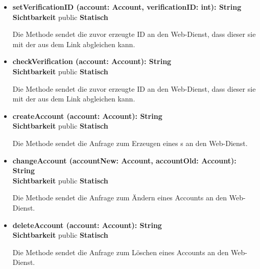 \begin{itemize}
\item \textbf{setVerificationID (account: Account, verificationID: int): String}\hfill\\
\textbf{Sichtbarkeit} public \newline
\textbf{Statisch}

Die Methode sendet die zuvor erzeugte ID an den Web-Dienst, dass dieser sie mit der aus dem Link abgleichen kann.

\item \textbf{checkVerification (account: Account): String}\hfill\\
\textbf{Sichtbarkeit} public \newline
\textbf{Statisch}

Die Methode sendet die zuvor erzeugte ID an den Web-Dienst, dass dieser sie mit der aus dem Link abgleichen kann.

\item \textbf{createAccount (account: Account): String}\hfill\\
\textbf{Sichtbarkeit} public \newline
\textbf{Statisch}

Die Methode sendet die Anfrage zum Erzeugen eines s an den Web-Dienst.

\item \textbf{changeAccount (accountNew: Account, accountOld: Account): String}\hfill\\
\textbf{Sichtbarkeit} public \newline
\textbf{Statisch}

Die Methode sendet die Anfrage zum Ändern eines Accounts an den Web-Dienst.

\item \textbf{deleteAccount (account: Account): String}\hfill\\
\textbf{Sichtbarkeit} public \newline
\textbf{Statisch}

Die Methode sendet die Anfrage zum Löschen eines Accounts an den Web-Dienst.

\end{itemize}
